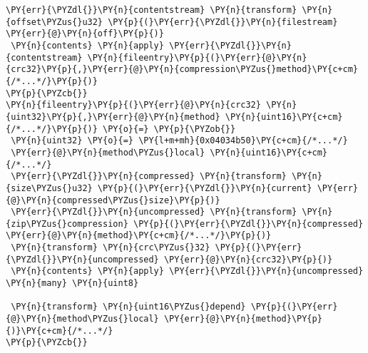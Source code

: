 \begin{Verbatim}[commandchars=\\\{\},codes={\catcode`\$=3\catcode`\^=7\catcode`\_=8}]
 \PY{err}{\PYZdl{}}\PY{n}{contentstream} \PY{n}{transform} \PY{n}{offset\PYZus{}u32} \PY{p}{(}\PY{err}{\PYZdl{}}\PY{n}{filestream} \PY{err}{@}\PY{n}{off}\PY{p}{)}
 \PY{n}{contents} \PY{n}{apply} \PY{err}{\PYZdl{}}\PY{n}{contentstream} \PY{n}{fileentry}\PY{p}{(}\PY{err}{@}\PY{n}{crc32}\PY{p}{,}\PY{err}{@}\PY{n}{compression\PYZus{}method}\PY{c+cm}{/*...*/}\PY{p}{)}
\PY{p}{\PYZcb{}}
\PY{n}{fileentry}\PY{p}{(}\PY{err}{@}\PY{n}{crc32} \PY{n}{uint32}\PY{p}{,}\PY{err}{@}\PY{n}{method} \PY{n}{uint16}\PY{c+cm}{/*...*/}\PY{p}{)} \PY{o}{=} \PY{p}{\PYZob{}}
 \PY{n}{uint32} \PY{o}{=} \PY{l+m+mh}{0x04034b50}\PY{c+cm}{/*...*/}
 \PY{err}{@}\PY{n}{method\PYZus{}local} \PY{n}{uint16}\PY{c+cm}{/*...*/}
 \PY{err}{\PYZdl{}}\PY{n}{compressed} \PY{n}{transform} \PY{n}{size\PYZus{}u32} \PY{p}{(}\PY{err}{\PYZdl{}}\PY{n}{current} \PY{err}{@}\PY{n}{compressed\PYZus{}size}\PY{p}{)}
 \PY{err}{\PYZdl{}}\PY{n}{uncompressed} \PY{n}{transform} \PY{n}{zip\PYZus{}compression} \PY{p}{(}\PY{err}{\PYZdl{}}\PY{n}{compressed} \PY{err}{@}\PY{n}{method}\PY{c+cm}{/*...*/}\PY{p}{)}
 \PY{n}{transform} \PY{n}{crc\PYZus{}32} \PY{p}{(}\PY{err}{\PYZdl{}}\PY{n}{uncompressed} \PY{err}{@}\PY{n}{crc32}\PY{p}{)}
 \PY{n}{contents} \PY{n}{apply} \PY{err}{\PYZdl{}}\PY{n}{uncompressed} \PY{n}{many} \PY{n}{uint8}
 
 \PY{n}{transform} \PY{n}{uint16\PYZus{}depend} \PY{p}{(}\PY{err}{@}\PY{n}{method\PYZus{}local} \PY{err}{@}\PY{n}{method}\PY{p}{)}\PY{c+cm}{/*...*/}
\PY{p}{\PYZcb{}}
\end{Verbatim}
